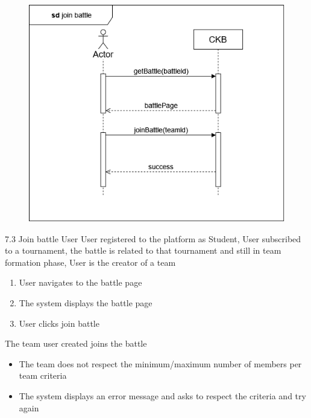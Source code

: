 \usecase
{
    \begin{figure}[H]
        \centering
        \includegraphics[width=\textwidth]{src/sd_diagrams/joinbattlelogin.png}
    \end{figure}
}
{7.3}
{Join battle} %
{User} %
{User registered to the platform as Student, User subscribed to a tournament, the battle is related to that tournament and still in team formation phase, User is the creator of a team} %
{ %
    \begin{enumerate}
        \item User navigates to the battle page
        \item The system displays the battle page
        \item User clicks join battle
    \end{enumerate}
}
{The team user created joins the battle} %
{ %
    \begin{itemize}
        \item The team does not respect the minimum/maximum number of members per team criteria
    \end{itemize}
}
{ %
    \begin{itemize}
        \item The system displays an error message and asks to respect the criteria and try again
    \end{itemize}
}


